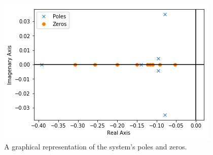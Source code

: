 \begin{figure}[H]
	\centering
	\includegraphics[width=0.7\linewidth]{Figures/Poles_and_Zeros}
	\caption{A graphical representation of the system's poles and zeros.}
	\label{fig:polesandzeros}
\end{figure}

